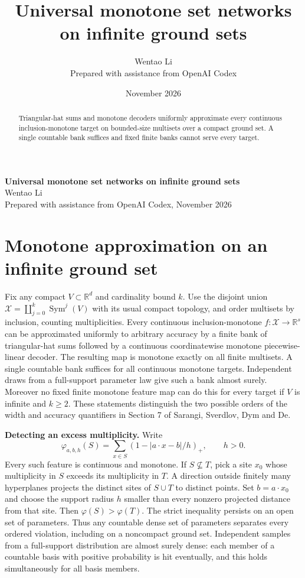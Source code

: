 \documentclass[10pt]{article}
\title{Universal monotone set networks on infinite ground sets}
\author{Wentao Li\\{\small Prepared with assistance from OpenAI Codex}}
\date{November 2026}
\begin{document}
\begin{center}{\Large\bfseries Universal monotone set networks on infinite ground sets}\\[3pt]Wentao Li\\{\small Prepared with assistance from OpenAI Codex, November 2026}\end{center}
\begin{abstract}
Triangular-hat sums and monotone decoders uniformly approximate every continuous inclusion-monotone target on bounded-size multisets over a compact ground set. A single countable bank suffices and fixed finite banks cannot serve every target.
\end{abstract}
\section*{Monotone approximation on an infinite ground set}
Fix any compact $V\subset\mathbb R^d$ and cardinality bound $k$. Use the disjoint union $\mathcal X=\coprod_{j=0}^k \operatorname{Sym}^j(V)$ with its usual compact topology, and order multisets by inclusion, counting multiplicities. Every continuous inclusion-monotone $f:\mathcal X\to\mathbb R^s$ can be approximated uniformly to arbitrary accuracy by a finite bank of triangular-hat sums followed by a continuous coordinatewise monotone piecewise-linear decoder. The resulting map is monotone exactly on all finite multisets. A single countable bank suffices for all continuous monotone targets. Independent draws from a full-support parameter law give such a bank almost surely. Moreover no fixed finite monotone feature map can do this for every target if $V$ is infinite and $k\ge2$. These statements distinguish the two possible orders of the width and accuracy quantifiers in Section 7 of Sarangi, Sverdlov, Dym and De.

\textbf{Detecting an excess multiplicity.} Write
\[
 \varphi_{a,b,h}(S)=\sum_{x\in S}(1-|a\cdot x-b|/h)_+,\qquad h>0 .
\]
Every such feature is continuous and monotone. If $S\not\subseteq T$, pick a site $x_0$ whose multiplicity in $S$ exceeds its multiplicity in $T$. A direction outside finitely many hyperplanes projects the distinct sites of $S\cup T$ to distinct points. Set $b=a\cdot x_0$ and choose the support radius $h$ smaller than every nonzero projected distance from that site. Then $\varphi(S)>\varphi(T)$. The strict inequality persists on an open set of parameters. Thus any countable dense set of parameters separates every ordered violation, including on a noncompact ground set. Independent samples from a full-support distribution are almost surely dense: each member of a countable basis with positive probability is hit eventually, and this holds simultaneously for all basis members.
\end{document}
